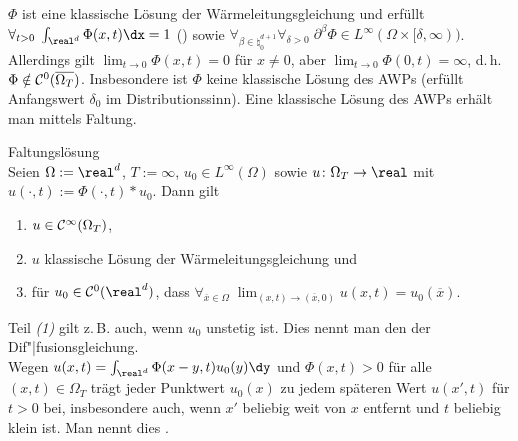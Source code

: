 \begin{Bem}
    $\Phi$ ist eine klassische Lösung der Wärmeleitungsgleichung und erfüllt\\
    $\forall_{t > 0}\; \int_{\real^d} \Phi(x, t) \dx = 1$ () sowie
    $\forall_{\beta \in \natural_0^{d+1}} \forall_{\delta > 0}\;
    \partial^\beta \Phi \in L^\infty(\Omega \times [\delta, \infty))$.\\
    Allerdings gilt $\lim_{t \to 0} \Phi(x, t) = 0$ für $x \not= 0$, aber
    $\lim_{t \to 0} \Phi(0, t) = \infty$, d.\,h. $\Phi \notin \mathcal{C}^0(\overline{\Omega_T})$.
    Insbesondere ist $\Phi$ keine klassische Lösung des AWPs
    (erfüllt Anfangswert $\delta_0$ im Distributionssinn).
    Eine klassische Lösung des AWPs erhält man mittels Faltung.
\end{Bem}

\begin{Satz}{Faltungslösung}\\
    Seien $\Omega := \real^d$, $T := \infty$,
    $u_0 \in L^\infty(\Omega)$ sowie $u\colon \Omega_T \to \real$ mit
    $u(\cdot, t) := \Phi(\cdot, t) \ast u_0$.
    Dann gilt
    \begin{enumerate}
        \item
        $u \in \mathcal{C}^\infty(\Omega_T)$,

        \item
        $u$ klassische Lösung der Wärmeleitungsgleichung und

        \item
        für $u_0 \in \C^0(\real^d)$, dass $\forall_{\overline{x} \in \Omega}\;
        \lim_{(x, t) \to (\overline{x}, 0)} u(x, t) = u_0(\overline{x})$.
    \end{enumerate}
\end{Satz}

\begin{Bem}
    Teil \emph{(1)} gilt z.\,B. auch, wenn $u_0$ unstetig ist.
    Dies nennt man den  der
    Dif"|fusionsgleichung.\\
    Wegen $u(x, t) = \int_{\real^d} \Phi(x - y, t) u_0(y) \dy$ und $\Phi(x, t) > 0$ für alle
    $(x, t) \in \Omega_T$ trägt jeder Punktwert $u_0(x)$ zu jedem späteren Wert $u(x', t)$
    für $t > 0$ bei,
    insbesondere auch, wenn $x'$ beliebig weit von $x$ entfernt und $t$ beliebig klein ist.
    Man nennt dies .
\end{Bem}

